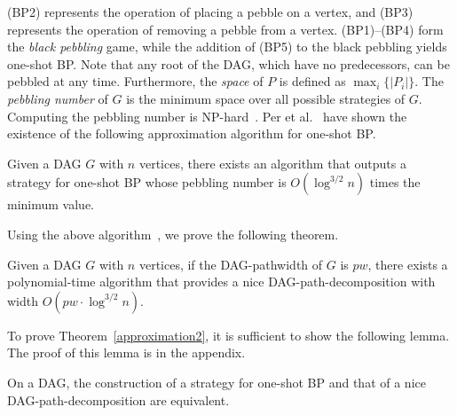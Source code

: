 \documentclass[runningheads]{llncs}
\theoremstyle{plain}
\theoremstyle{definition}
\begin{document}
(BP2) represents the operation of placing a pebble on a vertex, and (BP3) represents the operation of removing a pebble from a vertex. (BP1)--(BP4) form the \emph{black pebbling} game, while the addition of (BP5) to the black pebbling yields one-shot BP. Note that any root of the DAG, which have no predecessors, can be pebbled at any time. Furthermore, the \emph{space} of $P$ is defined as $\max_i \{ |P_i| \}$. The \emph{pebbling number} of $G$ is the minimum space over all possible strategies of $G$. Computing the pebbling number is NP-hard~\cite{art16}. %
%
%
Per et al.~\cite{art20} have shown the existence of the following approximation algorithm for one-shot BP.
%
\begin{proposition}
    Given a DAG $G$ with $n$ vertices, there exists an algorithm that outputs a strategy for one-shot BP whose pebbling number is $O(\log ^{3/2} n)$ times the minimum value.
\end{proposition}

Using the above algorithm~\cite{art20}, we prove the following theorem.

\begin{theorem}\label{approximation2}
    Given a DAG $G$ with $n$ vertices, if the DAG-pathwidth of $G$ is $pw$, there exists a polynomial-time algorithm that provides a nice DAG-path-decomposition with width $O(pw \cdot \log ^{3/2} n)$.
\end{theorem}

To prove Theorem~\ref{approximation2}, it is sufficient to show the following lemma. The proof of this lemma is in the appendix.
%
\begin{lemma}\label{lemma_approximation2}
    On a DAG, the construction of a strategy for one-shot BP and that of a nice DAG-path-decomposition are equivalent.
\end{lemma}
\end{document}
